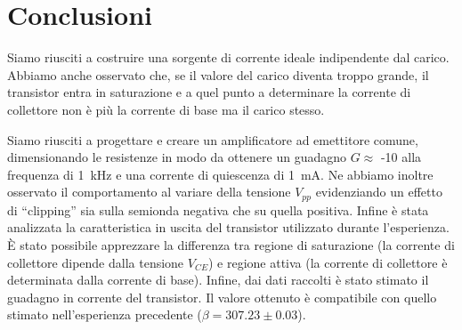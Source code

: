 \section{Conclusioni}
Siamo riusciti a costruire una sorgente di corrente ideale indipendente dal carico.
Abbiamo anche osservato che, se il valore del carico diventa troppo grande, il transistor entra in saturazione e a quel punto a determinare la corrente di collettore non è più la corrente di base ma il carico stesso.

Siamo riusciti a progettare e creare un amplificatore ad emettitore comune, dimensionando le resistenze in modo da ottenere un guadagno $G \approx$ -10 alla frequenza di \SI{1}{\kilo\hertz} e una corrente di quiescenza di \SI{1}{\milli\ampere}.
Ne abbiamo inoltre osservato il comportamento al variare della tensione $V_{pp}$ evidenziando un effetto di ``clipping'' sia sulla semionda negativa che su quella positiva. 
Infine è stata analizzata la caratteristica in uscita del transistor utilizzato durante l'esperienza.
È stato possibile apprezzare la differenza tra regione di saturazione (la corrente di collettore dipende dalla tensione $V_{CE}$) e regione attiva (la corrente di collettore è determinata dalla corrente di base).
Infine, dai dati  raccolti è stato stimato il guadagno in corrente del transistor. Il valore ottenuto è compatibile con quello stimato nell'esperienza precedente ($\beta = 307.23 \pm 0.03 $).
